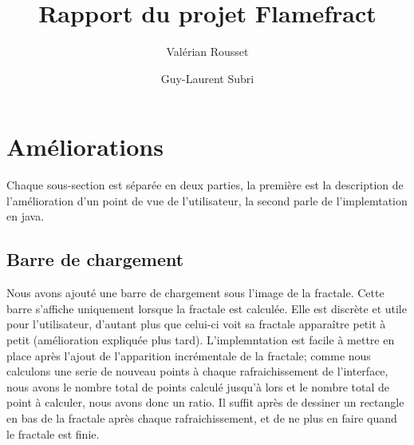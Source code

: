 \documentclass[a4paper]{article}
\author{Valérian Rousset \and Guy-Laurent Subri}
\title{Rapport du projet Flamefract}
\begin{document}
\maketitle

\section*{Améliorations}
Chaque sous-section est séparée en deux parties, la première est la description de l'amélioration d'un point de vue de l'utilisateur, la second parle de l'implemtation en java.

\subsection*{Barre de chargement}
Nous avons ajouté une barre de chargement sous l'image de la fractale. Cette barre s'affiche uniquement lorsque la fractale est calculée. Elle est discrète et utile pour l'utilisateur, d'autant plus que celui-ci voit sa fractale apparaître petit à petit (amélioration expliquée plus tard).
L'implemntation est facile à mettre en place après l'ajout de l'apparition incrémentale de la fractale; comme nous calculons une serie de nouveau points à chaque rafraichissement de l'interface, nous avons le nombre total de points calculé jusqu'à lors et le nombre total de point à calculer, nous avons donc un ratio. Il suffit après de dessiner un rectangle en bas de la fractale après chaque rafraichissement, et de ne plus en faire quand le fractale est finie.
\end{document}
